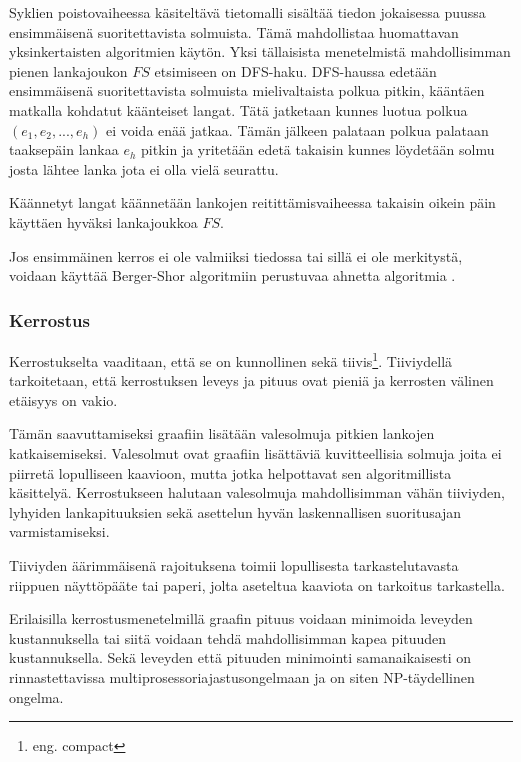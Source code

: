 \documentclass[finnish,12pt]{article}
\begin{document}
Syklien poistovaiheessa käsiteltävä tietomalli sisältää tiedon jokaisessa puussa ensimmäisenä suoritettavista solmuista.
Tämä mahdollistaa huomattavan yksinkertaisten algoritmien käytön.
Yksi tällaisista menetelmistä mahdollisimman pienen lankajoukon $FS$ etsimiseen on DFS-haku.
DFS-haussa edetään ensimmäisenä suoritettavista solmuista mielivaltaista polkua pitkin, kääntäen matkalla kohdatut käänteiset langat. Tätä jatketaan kunnes luotua polkua $(e_1,e_2, ..., e_h)$ ei voida enää jatkaa.
Tämän jälkeen palataan polkua palataan taaksepäin lankaa $e_h$ pitkin ja yritetään edetä takaisin kunnes löydetään solmu josta lähtee lanka jota ei olla vielä seurattu.
\cite{RefWorks:69}

Käännetyt langat käännetään lankojen reitittämisvaiheessa takaisin oikein päin käyttäen hyväksi lankajoukkoa $FS$.

Jos ensimmäinen kerros ei ole valmiiksi tiedossa tai sillä ei ole merkitystä, voidaan käyttää Berger-Shor algoritmiin \cite{RefWorks:68} perustuvaa ahnetta algoritmia \cite{RefWorks:48}.



		\subsubsection{Kerrostus}

Kerrostukselta vaaditaan, että se on kunnollinen sekä tiivis\footnote{eng. compact}.
Tiiviydellä tarkoitetaan, että kerrostuksen leveys ja pituus ovat pieniä ja kerrosten välinen etäisyys on vakio. 

Tämän saavuttamiseksi graafiin lisätään valesolmuja pitkien lankojen katkaisemiseksi.
Valesolmut ovat graafiin lisättäviä kuvitteellisia solmuja joita ei piirretä lopulliseen kaavioon, mutta jotka helpottavat sen algoritmillista käsittelyä.
Kerrostukseen halutaan valesolmuja mahdollisimman vähän tiiviyden, lyhyiden lankapituuksien sekä asettelun hyvän laskennallisen suoritusajan varmistamiseksi.

Tiiviyden äärimmäisenä rajoituksena toimii lopullisesta tarkastelutavasta riippuen näyttöpääte tai paperi, jolta aseteltua kaaviota on tarkoitus tarkastella.

Erilaisilla kerrostusmenetelmillä graafin pituus voidaan minimoida leveyden kustannuksella tai siitä voidaan tehdä mahdollisimman kapea pituuden kustannuksella.
Sekä leveyden että pituuden minimointi samanaikaisesti on rinnastettavissa multiprosessoriajastusongelmaan ja on siten NP-täydellinen ongelma. \cite{RefWorks:39}
\end{document}
